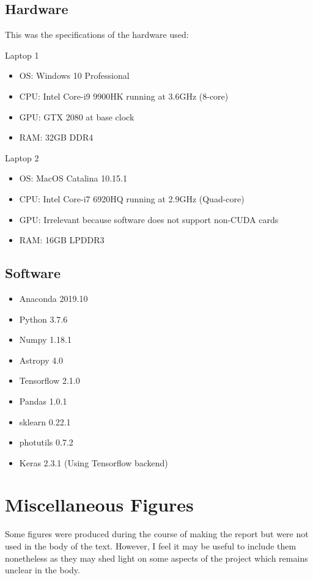 \documentclass[a4paper,fleqn,usenatbib]{mnras}
\begin{document}
\subsection{Hardware}
This was the specifications of the hardware used:

Laptop 1
\begin{itemize}
\item OS: Windows 10 Professional
\item CPU: Intel Core-i9 9900HK running at 3.6GHz (8-core)
\item GPU: GTX 2080 at base clock
\item RAM: 32GB DDR4
\end{itemize}

Laptop 2
\begin{itemize}
\item OS: MacOS Catalina 10.15.1
\item CPU: Intel Core-i7 6920HQ running at 2.9GHz (Quad-core)
\item GPU: Irrelevant because software does not support non-CUDA cards
\item RAM: 16GB LPDDR3
\end{itemize}

\subsection{Software}
\begin{itemize}
\item Anaconda 2019.10
\item Python 3.7.6
\item Numpy 1.18.1
\item Astropy 4.0
\item Tensorflow 2.1.0
\item Pandas 1.0.1
\item sklearn 0.22.1
\item photutils 0.7.2
\item Keras 2.3.1 (Using Tensorflow backend)	
\end{itemize}

\section{Miscellaneous Figures}
\label{ExtraFigs}
Some figures were produced during the course of making the report but were not used in the body of the text. However, I feel it may be useful to include them nonetheless as they may shed light on some aspects of the project which remains unclear in the body. 
\end{document}
